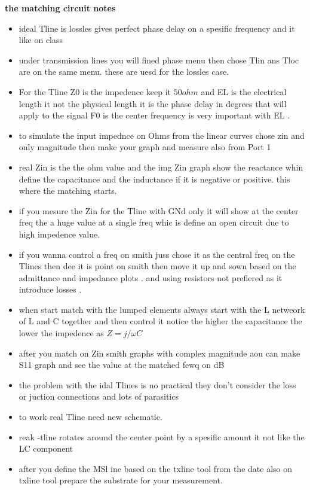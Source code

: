 \documentclass{article}
\begin{document}
\textbf{the matching circuit notes}
\begin{itemize}
    \textbf{from AWR mtch tutorial}
    \item ideal Tline is lossles gives perfect phase delay on a spesific frequency and it like on class
    \item under transmission lines you will fined phase menu then chose Tlin ans Tloc are on the  same menu. these are uesd for the lossles case.
    \item For the Tline Z0 is the impedence keep it $50 ohm$  and EL is the  electrical length it not the physical length it is the phase delay in degrees that will apply to the signal F0 is the center frequency is very important with EL .
    \item to simulate the input impednce on Ohms from the linear curves chose zin and only magnitude then make your graph and measure also  from Port 1
    \item real Zin is the the ohm value  and the img Zin graph show the reactance whin define the capacitance and the inductance if it is negative or positive. this where the matching starts.
    \item if you mesure the Zin for the Tline with GNd only it will show at the center freq the a huge value at a single freq whic is define an open circuit due to high impedence value.
    \item if you wanna control a freq on smith juss chose it as the central freq on the Tlines then dee it is point on smith then move it up and sown based on the admittance and impedance plots .  and using resistors not prefiered as it introduce losses .
    \item when start match with the lumped elements always start with the L netweork of L and C together and then control it notice the higher the capacitance the lower the impedence as $Z=j/\omega C$ 
    \item after you match on Zin smith graphs  with complex magnitude aou can make S11 graph and see the value at the matched fewq on dB
    \item the problem with the idal Tlines is no practical they don't consider the loss or juction connections and lots of parasitics 
    \item to work real Tline need new schematic. 
    \item reak -tline rotates around the center point by a spesific amount it not like the LC component 
    \item after you define the MSl ine based on the txline tool from the date also on txline tool prepare the substrate for your measurement.

\end{itemize}
\end{document}
